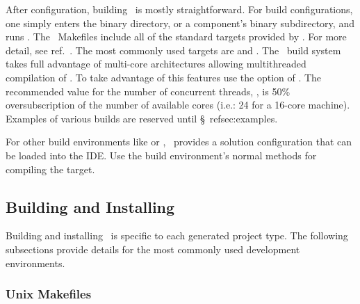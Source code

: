 After configuration, building \draco\ is mostly straightforward.  For   build configurations, 
one simply enters the binary directory, or a component's binary
subdirectory, and runs \gmake.  The \draco\ Makefiles include all of
the standard targets provided by \cmake.  For more detail, see ref.~\cite{cmake}. The most commonly used targets are  and .  
The \draco\ build system takes full advantage of multi-core architectures allowing multithreaded compilation of \draco.  
To take advantage of this features use the  option of \gmake.  The recommended value for the number of concurrent threads, 
, is 50\% oversubscription of the number of available cores (i.e.: 24 for a 16-core machine). Examples of various builds are reserved
until \S~ref{sec:examples}.

For other build environments like  or , \cmake\ provides a solution configuration that can be loaded into the IDE.  Use the 
build environment's normal methods for compiling the  target.

\subsection{Building and Installing}

Building and installing \draco\ is specific to each generated project type.  The following subsections provide details for the most commonly used development environments.

\subsubsection{Unix Makefiles}

